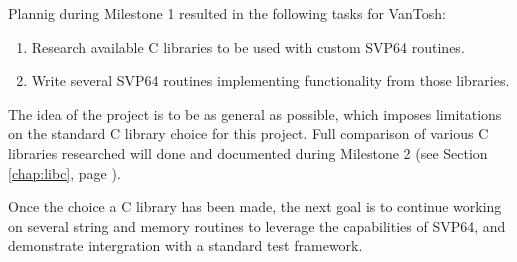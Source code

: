 Plannig during Milestone 1 resulted in the following tasks for VanTosh:

\begin{enumerate}
  \item Research available C libraries to be used with custom \acrshort{SVP64} routines.
  \item Write several \acrshort{SVP64} routines implementing functionality from those libraries.
\end{enumerate}

The idea of the project is to be as general as possible, which imposes limitations
on the standard C library choice for this project. Full comparison of various
C libraries researched will done and documented during Milestone 2
(see Section \ref{chap:libc}, page \pageref{chap:libc}).

Once the choice a C library has been made, the next goal is to continue working on
several string and memory routines to leverage the capabilities of \acrshort{SVP64},
and demonstrate intergration with a standard test framework.

